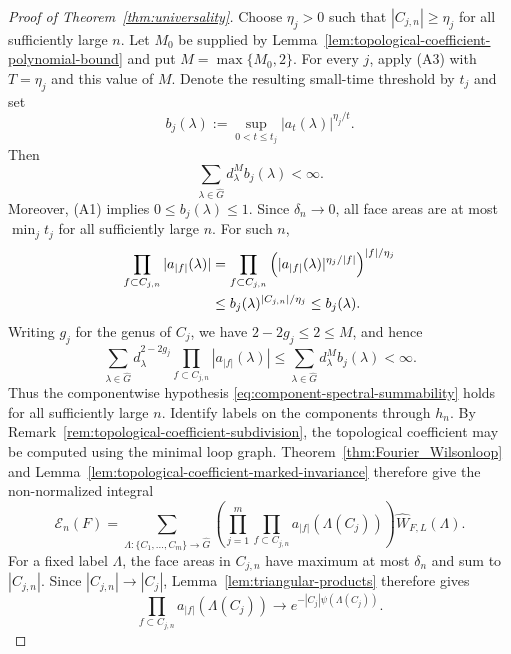 \documentclass[11pt,a4paper,reqno]{article}
\theoremstyle{definition}
\theoremstyle{remark}
\begin{document}
\begin{proof}[Proof of Theorem~\ref{thm:universality}]
Choose $\eta_j>0$ such that $|C_{j,n}|\geq\eta_j$ for all sufficiently
large $n$. Let $M_0$ be supplied by
Lemma~\ref{lem:topological-coefficient-polynomial-bound} and put
$M=\max\{M_0,2\}$. For every $j$, apply (A3) with $T=\eta_j$ and this
value of $M$. Denote the resulting small-time threshold by $t_j$ and set
\[
 b_j(\lambda)
 :=\sup_{0<t\leq t_j}|a_t(\lambda)|^{\eta_j/t}.
\]
Then
\begin{equation}\label{eq:universality-single-plaquette-envelope}
 \sum_{\lambda\in\widehat G}
 d_\lambda^M b_j(\lambda)<\infty.
\end{equation}
Moreover, (A1) implies $0\leq b_j(\lambda)\leq1$. Since
$\delta_n\to0$, all face areas are at most $\min_jt_j$ for all
sufficiently large $n$. For such $n$,
\begin{align}
 \prod_{f\subset C_{j,n}}
 |a_{|f|}(\lambda)|
 &=\prod_{f\subset C_{j,n}}
 \left(
 |a_{|f|}(\lambda)|^{\eta_j/|f|}
 \right)^{|f|/\eta_j}\notag\\
 &\leq b_j(\lambda)^{|C_{j,n}|/\eta_j}
 \leq b_j(\lambda).
 \label{eq:component-product-envelope}
\end{align}
Writing $g_j$ for the genus of $C_j$, we have $2-2g_j\leq2\leq M$, and hence
\[
 \sum_{\lambda\in\widehat G}
 d_\lambda^{2-2g_j}
 \prod_{f\subset C_{j,n}}|a_{|f|}(\lambda)|
 \leq
 \sum_{\lambda\in\widehat G}d_\lambda^M b_j(\lambda)<\infty.
\]
Thus the componentwise hypothesis
\eqref{eq:component-spectral-summability} holds for all sufficiently
large $n$. Identify labels on the components through $h_n$. By
Remark~\ref{rem:topological-coefficient-subdivision}, the topological
coefficient may be computed using the minimal loop graph. Theorem~\ref{thm:Fourier_Wilsonloop} and
Lemma~\ref{lem:topological-coefficient-marked-invariance} therefore give
the non-normalized integral
\[
 \mathcal E_n(F)
 =
 \sum_{\Lambda:\{C_1,\ldots,C_m\}\to\widehat G}
 \left(
 \prod_{j=1}^m
 \prod_{f\subset C_{j,n}}
 a_{|f|}(\Lambda(C_j))
 \right)
 \widehat W_{F,L}(\Lambda).
\]
For a fixed label $\Lambda$, the face areas in $C_{j,n}$ have maximum at
most $\delta_n$ and sum to $|C_{j,n}|$. Since $|C_{j,n}|\to |C_j|$,
Lemma~\ref{lem:triangular-products} therefore gives
\[
 \prod_{f\subset C_{j,n}}
 a_{|f|}(\Lambda(C_j))
 \longrightarrow
 e^{-|C_j|\psi(\Lambda(C_j))}.
\]


\end{proof}
\end{document}
